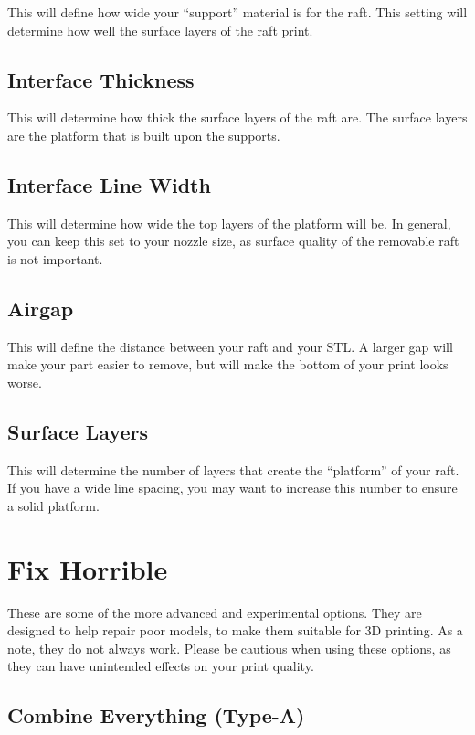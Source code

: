 This will define how wide your “support” material is for the raft. This setting will determine how well the surface layers of the raft print.

\subsection{Interface Thickness}

This will determine how thick the surface layers of the raft are. The surface layers are the platform that is built upon the supports.

\subsection{Interface Line Width}

This will determine how wide the top layers of the platform will be. In general, you can keep this set to your nozzle size, as surface quality of the removable raft is not important.

\subsection{Airgap}

This will define the distance between your raft and your STL. A larger gap will make your part easier to remove, but will make the bottom of your print looks worse.

\subsection{Surface Layers}

This will determine the number of layers that create the “platform” of your raft. If you have a wide line spacing, you may want to increase this number to ensure a solid platform. 

\section{Fix Horrible}

These are some of the more advanced and experimental options. They are designed to help repair poor models, to make them suitable for 3D printing. As a note, they do not always work. Please be cautious when using these options, as they can have unintended effects on your print quality.

\subsection{Combine Everything (Type-A)}

